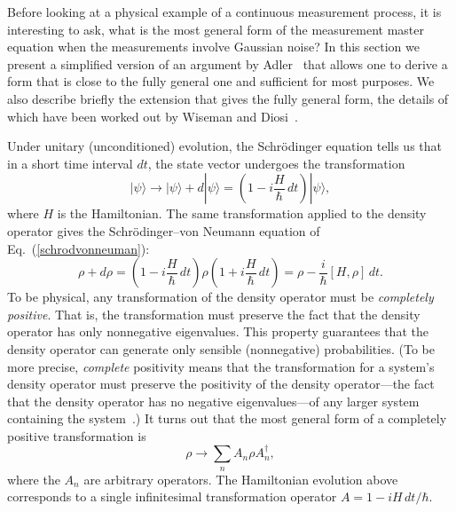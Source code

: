 \documentclass[aps,twocolumn,superscriptaddress,footinbib,floatfix,showpacs]{revtex4}
\def\ket#1{|{#1}\rangle}
\begin{document}
Before looking at a physical example of a continuous measurement process,
it is interesting to ask, what is the most general form of the measurement 
master equation when the measurements involve Gaussian noise?  
In this section we present a simplified version of an
argument by Adler~\cite{Adler00} that allows one to derive a form 
that is close to the fully general one and sufficient for most purposes. We 
also describe briefly the extension that gives the fully general form, the details 
of which have been worked out by Wiseman and Diosi~\cite{Wiseman01}. 

Under unitary (unconditioned) evolution, the Schr\"odinger equation
tells us that in a short time interval $dt$, the state vector
undergoes the transformation 
\begin{equation}
  \ket\psi \longrightarrow \ket\psi + d\ket\psi =
    \left(1-i\frac{H}{\hbar}\,dt\right)\ket\psi,
\end{equation}
where $H$ is the Hamiltonian.
The same transformation applied to the density operator gives the
Schr\"odinger--von Neumann equation of Eq.~(\ref{schrodvonneuman}):
\begin{equation}
    \rho + d\rho = 
    \left(1-i\frac{H}{\hbar}\,dt\right)\rho \left(1+i\frac{H}{\hbar}\,dt\right)
    = \rho-\frac{i}{\hbar}[H,\rho]\,dt.
\end{equation}
To be physical, any transformation of the density operator must be
\textit{completely positive}. That is, the transformation must preserve the
fact that the density operator has only nonnegative eigenvalues.
This property guarantees that the density operator can generate only sensible 
(nonnegative)
probabilities. (To be more precise, \textit{complete} positivity means that 
the transformation for a system's density operator 
must preserve the positivity of the density operator---the fact that
the density operator has no negative eigenvalues---of any larger system 
containing
the system~\cite{mikeandike}.)
It turns out that the most general form of a completely positive
transformation is
\begin{equation}
  \rho\longrightarrow \sum_n A_n\rho A_n^\dagger,
  \label{rhotransform}
\end{equation}
where the $A_n$ are arbitrary operators.
The Hamiltonian evolution above corresponds to a single infinitesimal
transformation
operator $A=1-iH\,dt/\hbar$.
\end{document}
